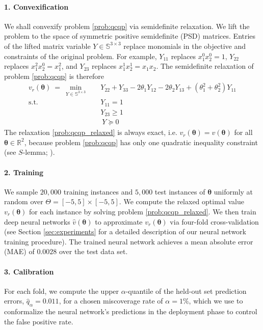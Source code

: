 \documentclass[10pt]{article} %
\theoremstyle{plain}
\theoremstyle{definition}
\theoremstyle{remark}
\begin{document}
\paragraph{1. Convexification} We shall convexify problem \cref{prob:qcqp} via semidefinite relaxation. We lift the problem to the space of symmetric positive semidefinite (PSD) matrices. Entries of the lifted matrix variable $Y \in \mathbb{S}^{3 \times 3}$ replace monomials in the objective and constraints of the original problem. For example, $Y_{11}$ replaces $x_1^0 x_2^0 = 1$, $Y_{22}$ replaces $x_1^2 x_2^0 = x_1^2$, and $Y_{23}$ replaces $x_1^1 x_2^1 = x_1 x_2$. The semidefinite relaxation of problem \cref{prob:qcqp} is therefore
\begin{equation}
\begin{aligned}
v_r(\bm{\theta}) ~=~ \min_{Y \in \mathbb{S}^{3 \times 3}} \quad 
&Y_{22} + Y_{33} - 2 \theta_1 Y_{12} - 2 \theta_2 Y_{13} + (\theta_1^2 + \theta_2^2) Y_{11} \\ 
\text{s.t.}\quad & Y_{11} = 1 \\[3pt]
& Y_{23} \geq 1 \\[4pt]
& ~Y \succeq 0
\end{aligned}
\label{prob:qcqp_relaxed}
\end{equation}
The relaxation \cref{prob:qcqp_relaxed} is always exact, i.e. $v_r(\bm{\theta}) = v(\bm{\theta})$ for all $\bm{\theta} \in \mathbb{R}^2$, because problem \cref{prob:qcqp}{}{} has only one quadratic inequality constraint (see $S$-lemma; \cite{boyd2004convex}). 

\paragraph{2. Training} We sample $20{,}000$ training instances and $5{,}000$ test instances of $\bm{\theta}$ uniformly at random over $\Theta = [-5,5] \times [-5,5]$. We compute the relaxed optimal value $v_r(\bm{\theta})$ for each instance by solving problem \cref{prob:qcqp_relaxed}{}{}. We then train deep neural networks $\hat{v}(\bm{\theta})$ to approximate $v_r(\bm{\theta})$ via four-fold cross-validation (see Section \ref{sec:experiments} for a detailed description of our neural network training procedure). The trained neural network achieves a mean absolute error (MAE) of $0.0028$ over the test data set.

\paragraph{3. Calibration} For each fold, we compute the upper $\alpha$-quantile of the held-out set prediction errors, $\hat{q}_\alpha = 0.011$, for a chosen miscoverage rate of $\alpha = 1\%$, which we use to conformalize the neural network's predictions in the deployment phase to control the false positive rate.
\end{document}
